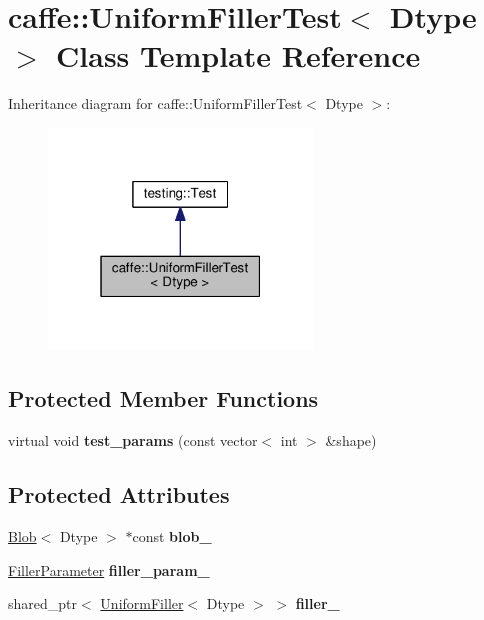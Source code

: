 \hypertarget{classcaffe_1_1_uniform_filler_test}{}\section{caffe\+:\+:Uniform\+Filler\+Test$<$ Dtype $>$ Class Template Reference}
\label{classcaffe_1_1_uniform_filler_test}


Inheritance diagram for caffe\+:\+:Uniform\+Filler\+Test$<$ Dtype $>$\+:
\nopagebreak
\begin{figure}[H]
\begin{center}
\leavevmode
\includegraphics[width=199pt]{classcaffe_1_1_uniform_filler_test__inherit__graph}
\end{center}
\end{figure}
\subsection*{Protected Member Functions}
\begin{DoxyCompactItemize}
\item 
\mbox{\label{classcaffe_1_1_uniform_filler_test_a349e92c4490320cc53e1a2e4ed8fb9ec}} 
virtual void {\bfseries test\+\_\+params} (const vector$<$ int $>$ \&shape)
\end{DoxyCompactItemize}
\subsection*{Protected Attributes}
\begin{DoxyCompactItemize}
\item 
\mbox{\label{classcaffe_1_1_uniform_filler_test_ad11a8f8e30835ae07340deb3663a21cc}} 
\mbox{\hyperlink{classcaffe_1_1_blob}{Blob}}$<$ Dtype $>$ $\ast$const {\bfseries blob\+\_\+}
\item 
\mbox{\label{classcaffe_1_1_uniform_filler_test_a1639040ac615a5a4a13df866159aa041}} 
\mbox{\hyperlink{classcaffe_1_1_filler_parameter}{Filler\+Parameter}} {\bfseries filler\+\_\+param\+\_\+}
\item 
\mbox{\label{classcaffe_1_1_uniform_filler_test_a0f449053d9c3cd3103c2aa4fe807c9dc}} 
shared\+\_\+ptr$<$ \mbox{\hyperlink{classcaffe_1_1_uniform_filler}{Uniform\+Filler}}$<$ Dtype $>$ $>$ {\bfseries filler\+\_\+}
\end{DoxyCompactItemize}
